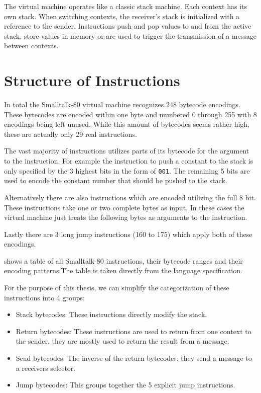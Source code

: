 
The virtual machine operates like a classic stack machine. Each context has its own stack. When switching contexts, the receiver's stack is initialized with a reference to the sender. Instructions push and pop values to and from the active stack, store values in memory or are used to trigger the transmission of a message between contexts. 

\section{Structure of Instructions}
In total the Smalltalk-80 virtual machine recognizes 248 bytecode encodings. These bytecodes are encoded within one byte and numbered 0 through 255 with 8 encodings being left unused. 
While this amount of bytecodes seems rather high, these are actually only 29 real instructions. 

The vast majority of instructions utilizes parts of its bytecode for the argument to the instruction. For example the instruction to push a constant to the stack is only specified by the 3 highest bits in the form of \texttt{001}. The remaining 5 bits are used to encode the constant number that should be pushed to the stack. 

Alternatively there are also instructions which are encoded utilizing the full 8 bit. These instructions take one or two complete bytes as input. In these cases the virtual machine just treats the following bytes as arguments to the instruction. 

Lastly there are 3 long jump instructions (160 to 175) which apply both of these encodings.

 shows a table of all Smalltalk-80 instructions, their bytecode ranges and their encoding patterns.The table is taken directly from the language specification.


For the purpose of this thesis, we can simplify the categorization of these instructions into 4 groups: 
\begin{itemize}
  \item Stack bytecodes: These instructions directly modify the stack. 
  \item Return bytecodes: These instructions are used to return from one context to the sender, they are mostly used to return the result from a message. 
  \item Send bytecodes: The inverse of the return bytecodes, they send a message to a receivers selector.
  \item Jump bytecodes: This groups together the 5 explicit jump instructions.
\end{itemize}

